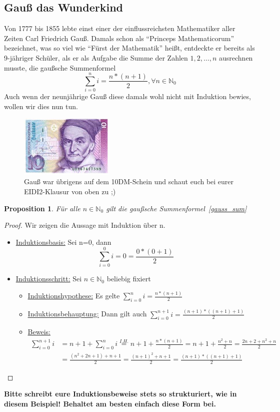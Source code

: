 \documentclass[hidelinks]{article}
\theoremstyle{plain}
\newtheorem{prop}[thm]{Proposition}
\theoremstyle{definition}
\theoremstyle{rem}
\begin{document}
\begin{sloppypar}
\subsection{Gauß das Wunderkind}
Von 1777 bis 1855 lebte einst einer der einflussreichsten Mathematiker aller Zeiten Carl Friedrich Gauß. Damals schon als ``Princeps Mathematicorum'' bezeichnet, was so viel wie ``Fürst der Mathematik'' heißt, entdeckte er bereits als 9-jähriger Schüler, als er als Aufgabe die Summe der Zahlen $1,2,\ldots,n$ ausrechnen musste, die gaußsche Summenformel
\begin{equation}
\sum_{i=0}^{n}i=\frac{n*(n+1)}{2},\forall n\in \mathbb{N}_0\label{gauss_sum}
\end{equation}
Auch wenn der neunjährige Gauß diese damals wohl nicht mit Induktion bewies, wollen wir dies nun tun.
\begin{figure}
	\includegraphics[width=4.5cm]{gauss.jpg}
	\centering
	\caption*{\small{Gauß war übrigens auf dem 10DM-Schein und schaut euch bei eurer EIDI2-Klausur von oben zu ;)}}
\end{figure}
\begin{prop}
Für alle $n\in \mathbb{N}_0$ gilt die gaußsche Summenformel~\eqref{gauss_sum}
\end{prop}
\begin{proof}
Wir zeigen die Aussage mit Induktion über n.
\begin{itemize}
\item \underline{Induktionsbasis:} Sei n=0, dann
\begin{equation*}
	\sum_{i=0}^{0}i=0=\frac{0*(0+1)}{2}
\end{equation*}
\item \underline{Induktionsschritt:} Sei $n\in \mathbb{N}_0$ beliebig fixiert
	\begin{itemize}
	\item \underline{Induktionshypothese:} Es gelte $\sum_{i=0}^{n}i=\frac{n*(n+1)}{2}$
	\item \underline{Induktionsbehauptung:} Dann gilt auch $\sum_{i=0}^{n+1}i=\frac{(n+1)*((n+1)+1)}{2}$
	\item \underline{Beweis:}
	\begin{align*}
		\sum_{i=0}^{n+1}i&=n+1+\sum_{i=0}^{n}i\stackrel{I.H.}{=}n+1+\frac{n*(n+1)}{2}=n+1+\frac{n^2+n}{2}=\frac{2n+2+n^2+n}{2}\\
		&=\frac{(n^2+2n+1)+n+1}{2}=\frac{(n+1)^2+n+1}{2}=\frac{(n+1)*((n+1)+1)}{2}
	\end{align*}
	\end{itemize}
\end{itemize}
\hfill
\end{proof}
\textbf{Bitte schreibt eure Induktionsbeweise stets so strukturiert, wie in diesem Beispiel! Behaltet am besten einfach diese Form bei.}

\end{sloppypar}
\end{document}
